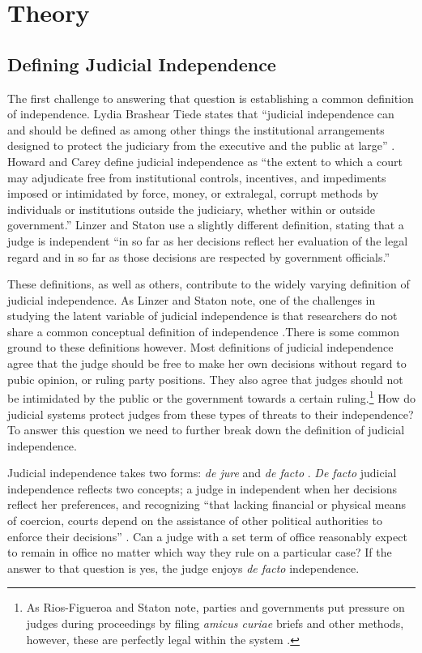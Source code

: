 \documentclass[12pt]{article}
\begin{document}
\section*{Theory}
\subsection*{Defining Judicial Independence}
The first challenge to answering that question is establishing a common definition of independence.  Lydia Brashear Tiede states that ``judicial independence can and should be defined as among other things the institutional arrangements designed to protect the judiciary from the executive and the public at large'' \citep{Tiede2006}.  Howard and Carey \citeyearpar{Howard2004} define judicial independence as ``the extent to which a court may adjudicate free from institutional controls, incentives, and impediments imposed or intimidated by force, money, or extralegal, corrupt methods by individuals or institutions outside the judiciary, whether within or outside government.''  Linzer and Staton \citeyearpar{Linzer2014} use a slightly different definition, stating that a judge is independent ``in so far as her decisions reflect her evaluation of the legal regard and in so far as those decisions are respected by government officials.''  

These definitions, as well as others, contribute to the widely varying definition of judicial independence.  As Linzer and Staton note, one of the challenges in studying the latent variable of judicial independence is that researchers do not share a common conceptual definition of independence \citep{Linzer2014}.There is some common ground to these definitions however.  Most definitions of judicial independence agree that the judge should be free to make her own decisions without regard to pubic opinion, or ruling party positions.  They also agree that judges should not be intimidated by the public or the government towards a certain ruling.\footnote{As Rios-Figueroa and Staton note, parties and governments put pressure on judges during proceedings by filing \textit{amicus curiae} briefs and other methods, however, these are perfectly legal within the system \citep[4]{Rios2014}.}  How do judicial systems protect judges from these types of threats to their independence?  To answer this question we need to further break down the definition of judicial independence. 

Judicial independence takes two forms: \textit{de jure} and \textit{de facto} \citep{Feld2003,Rios2014, Rosenberg1991}.  \textit{De facto} judicial independence reflects two concepts; a judge in independent when her decisions reflect her preferences, and recognizing ``that lacking financial or physical means of coercion, courts depend on the assistance of other political authorities to enforce their decisions'' \citep{Rios2014}. Can a judge with a set term of office reasonably expect to remain in office no matter which way they rule on a particular case? If the answer to that question is yes, the judge enjoys \textit{de facto} independence. 
\end{document}
